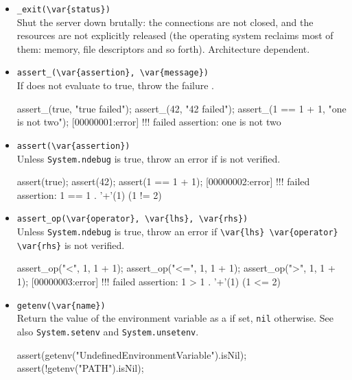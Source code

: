 \begin{itemize}
\item \lstinline|_exit(\var{status})|\\
  Shut the server down brutally: the connections are not closed, and
  the resources are not explicitly released (the operating system
  reclaims most of them: memory, file descriptors and so forth).
  Architecture dependent.

\item \lstinline|assert_(\var{assertion}, \var{message})|\\
  If  does not evaluate to true, throw the failure
  .
\begin{urbiscript}
assert_(true,       "true failed");
assert_(42,         "42 failed");
assert_(1 == 1 + 1, "one is not two");
[00000001:error] !!! failed assertion: one is not two
\end{urbiscript}

\item \lstinline|assert(\var{assertion})|\\
  Unless \lstinline|System.ndebug| is true, throw an error if
   is not verified.
\begin{urbiscript}[firstnumber=last]
assert(true);
assert(42);
assert(1 == 1 + 1);
[00000002:error] !!! failed assertion: 1 == 1 . '+'(1) (1 != 2)
\end{urbiscript}

\item \lstinline|assert_op(\var{operator}, \var{lhs}, \var{rhs})|\\
  Unless \lstinline|System.ndebug| is true, throw an error if
  \lstinline|\var{lhs} \var{operator} \var{rhs}| is not verified.
\begin{urbiscript}[firstnumber=last]
assert_op("<",  1, 1 + 1);
assert_op("<=", 1, 1 + 1);
assert_op(">",  1, 1 + 1);
[00000003:error] !!! failed assertion: 1 > 1 . '+'(1) (1 <= 2)
\end{urbiscript}

\item \lstinline|getenv(\var{name})|\\
  Return the value of the environment variable  as a
   if set, \lstinline|nil| otherwise.  See also
  \lstinline|System.setenv| and \lstinline|System.unsetenv|.
\begin{urbiscript}[firstnumber=last]
assert(getenv("UndefinedEnvironmentVariable").isNil);
assert(!getenv("PATH").isNil);
\end{urbiscript}


\end{itemize}
